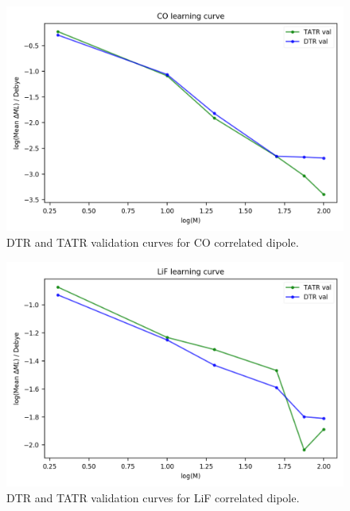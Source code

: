 \begin{figure}
    \centering
    \includegraphics[scale=1.0]{p2/figures/si/CO_learn_log_d.png}
    \caption{DTR and TATR validation curves for CO correlated dipole.}
\end{figure}

\begin{figure}
    \centering
    \includegraphics[scale=1.0]{p2/figures/si/LiF_learn_log_d.png}
    \caption{DTR and TATR validation curves for LiF correlated dipole.}
\end{figure}

